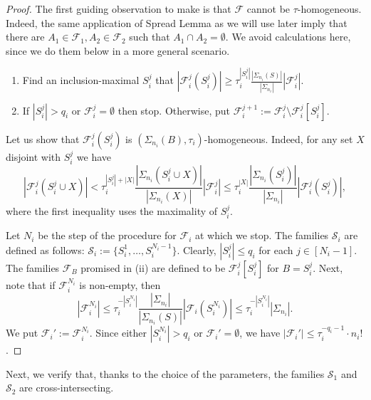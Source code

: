 \documentclass[11pt]{extarticle}
\numberwithin{equation}{section} %
\theoremstyle{plain}
\theoremstyle{definition}
\newcommand{\FF}{\mathcal{F}}
\newcommand{\ff}{\mathcal{F}}
\newcommand{\m}{\mathcal}
\begin{document}
\begin{proof} The first guiding observation to make is that $\FF$ cannot be $\tau$-homogeneous.  
Indeed, the same application of Spread Lemma as we will use later imply that there are $A_1 \in \FF_1, A_2 \in \FF_2$ such that $A_1 \cap A_2=\emptyset$. We avoid calculations here, since we do them below in a more general scenario.  

\begin{enumerate}
    \item Find an inclusion-maximal $S_i^{j}$ that  $|\FF_{i}^j(S_i^{j})| \ge  \tau^{|S_i^{j}|}_i \frac{|\Sigma_{n_i}(S)|}{|\Sigma_{n_i}|}|\FF_i^{j}|$.
    \item If $|S_i^{j}|> q_i$ or $\FF_{i}^j = \emptyset$ then stop. Otherwise, put $\FF_{i}^{j+1}:=\FF_{i}^j\setminus \FF_{i}^{j}[S_i^{j}]$. 
\end{enumerate}
Let us show that $\FF_{i}^j(S_i^{j})$ is $(\Sigma_{n_i}(B), \tau_i)$-homogeneous. Indeed, for any set $X$ disjoint with $S_i^j$ we have
$$|\FF_{i}^j(S_i^{j}\cup X)|< \tau_i^{|S_i^{j}|+|X|} \frac{|\Sigma_{n_i}(S_i^j\cup X)|}{|\Sigma_{n_i}(X)|} |\ff_i^j|\le \tau_i^{|X|} \frac{|\Sigma_{n_i}(S_i^j)|}{|\Sigma_{n_i}|} |\FF_{i}^j (S_i^{j})|,$$
where the first inequality uses the maximality of $S_i^j.$

Let $N_i$ be the step of the procedure for $\FF_i$ at which we stop. The families $\m{S}_i$ are defined as follows: $\m{S}_i:=\{S_i^{1},\ldots, S_i^{N_i-1}\}$. Clearly, $|S_i^{j}|\le q_i$ for each $j\in [N_i-1]$. The families $\FF_{B}$ promised in (ii) are defined to be $\FF_{i}^j[S_i^j]$ for $B=S_i^j$. Next, note that if $\FF_i^{N_i}$ is non-empty, then 
$$
|\FF_{i}^{N_i}|\le \tau_i^{-|S_i^{N_i}|} \frac{|\Sigma_{n_i}|}{|\Sigma_{n_i}(S)|}|\FF_i(S_i^{N_i})|\le \tau_i^{-|S_i^{N_i}|}|\Sigma_{n_i}|.
$$
We put $\FF_i':=\FF_i^{N_i}$. Since either $|S_i^{N_i}|>q_i$ or $\FF_i' = \emptyset $, we have $|\FF_i'| \leq \tau^{-q_i-1}_i \cdot n_i!$.
\end{proof}

Next, we verify that, thanks to the choice of the  parameters, the families $\m{S}_1$ and $\m{S}_2$ are cross-intersecting. 
\end{document}
